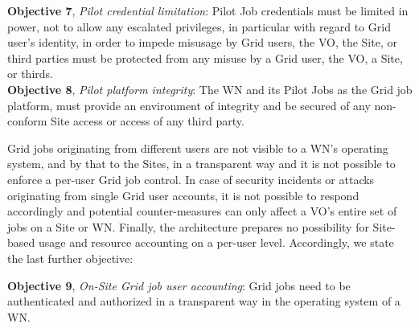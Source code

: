 \documentclass[10pt]{iopart}
\begin{document}
\noindent
\textbf{Objective 7}, \textit{Pilot credential limitation}:
Pilot Job credentials must be limited in power, not to allow any escalated
privileges, in particular with regard to Grid user's identity, in order to 
impede misusage by Grid users, the
VO, the Site, or third parties
must be protected from any misuse by a
Grid user, the VO, a Site, or thirds.\\

\noindent
\textbf{Objective 8}, \textit{Pilot platform integrity}:
The WN and its Pilot Jobs as the Grid job platform, must provide an
environment of integrity and be secured of any non-conform Site access or
access of any third party.\\
\par
\endgroup\noindent
Grid jobs originating from different users are not visible to
a WN's operating system, and by that to the Sites, in a transparent way and it
is not possible to enforce a per-user Grid job control. In case of security incidents or
attacks originating from single Grid user accounts, it is not
possible to respond accordingly and potential counter-measures can only affect
a VO's entire set of jobs on a Site or WN. Finally, the architecture prepares
no possibility for Site-based usage and resource accounting on a per-user
level. Accordingly, we state the last further
objective:\\
\par
\begingroup
\leftskip=0.4cm
\noindent
\textbf{Objective 9}, \textit{On-Site Grid job user accounting}: Grid
jobs need to be authenticated and authorized in a transparent way in the
operating system of a WN.\\
\par
\endgroup\noindent
\end{document}
